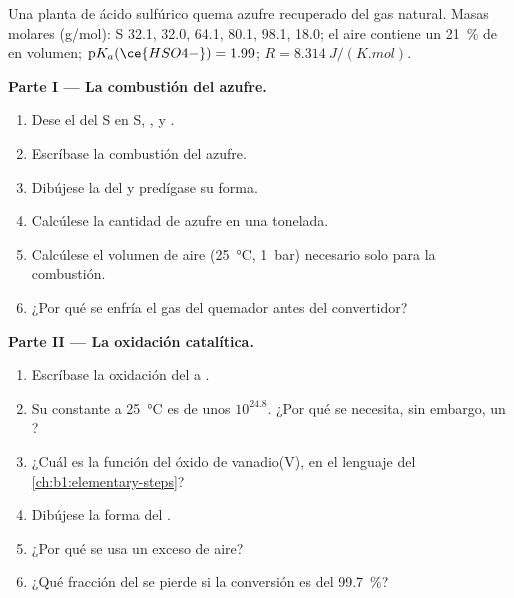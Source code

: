 \begin{problem}
\label{pb:b1:p-block-16-18:1}
Una planta de ácido sulfúrico quema azufre recuperado del gas natural.
Masas molares
(\unit{g/mol}): S 32.1,  32.0,  64.1,  80.1,
 98.1,  18.0; el aire contiene un \qty{21}{\percent} de
 en volumen; $\mathrm{p}K_a(\ce{HSO4-}) = 1.99$; $R =
\qty{8.314}{J/(K.mol)}$.

\medskip
\noindent\textbf{Parte I --- La combustión del azufre.}
\begin{enumerate}
  \item Dese el  del S en S, ,  y
        .
  \item Escríbase la combustión del azufre.
  \item Dibújese la  del  y predígase su forma.
  \item Calcúlese la cantidad de azufre en una tonelada.
  \item Calcúlese el volumen de aire (\qty{25}{\celsius}, \qty{1}{bar})
        necesario solo para la combustión.
  \item ¿Por qué se enfría el gas del quemador antes del convertidor?
\end{enumerate}

\medskip
\noindent\textbf{Parte II --- La oxidación catalítica.}
\begin{enumerate}[resume]
  \item Escríbase la oxidación del  a .
  \item Su constante a \qty{25}{\celsius} es de unos $10^{24.8}$. ¿Por qué
        se necesita, sin embargo, un ?
  \item ¿Cuál es la función del óxido de vanadio(V), en el lenguaje del
        \cref{ch:b1:elementary-steps}?
  \item Dibújese la forma del .
  \item ¿Por qué se usa un exceso de aire?
  \item ¿Qué fracción del  se pierde si la conversión es del
        \qty{99.7}{\percent}?
\end{enumerate}


\end{problem}
